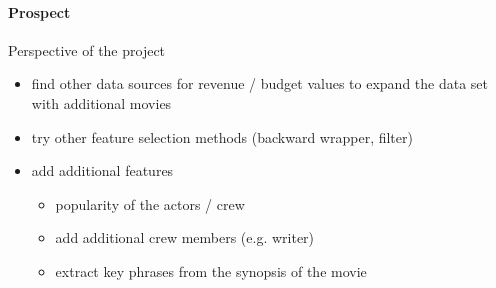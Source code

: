 \paragraph{Prospect}
Perspective of the project
\label{cha:prospect}
\begin{itemize}
	\item find other data sources for revenue / budget values to expand the data set with additional movies
	\item try other feature selection methods (backward wrapper, filter)
	\item add additional features
	\begin{itemize}
		\item popularity of the actors / crew
		\item add additional crew members (e.g. writer)
		\item extract key phrases from the synopsis of the movie
	\end{itemize}
\end{itemize}